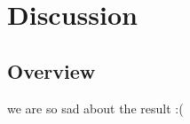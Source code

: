 \documentclass[../thesis.tex]{subfiles} %
\begin{document}
\section{Discussion}
\subsection{Overview}
we are so sad about the result :(
\end{document}
